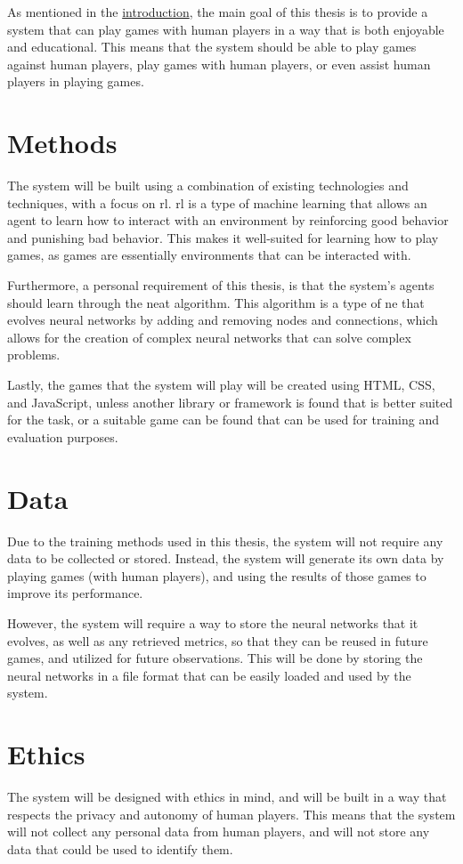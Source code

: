 As mentioned in the \hyperref[ch:intro]{introduction}, the main goal of this
thesis is to provide a system that can play games with human players in a way
that is both enjoyable and educational. This means that the system should be
able to play games against human players, play games with human players, or
even assist human players in playing games.

\section{Methods}\label{sec:innovation-methods}
The system will be built using a combination of existing technologies and
techniques, with a focus on \gls{rl}. \gls{rl} is a type of machine learning
that allows an agent to learn how to interact with an environment by
reinforcing good behavior and punishing bad behavior. This makes it well-suited
for learning how to play games, as games are essentially environments that can
be interacted with.

Furthermore, a personal requirement of this thesis, is that the system's 
agents should learn through the \gls{neat} algorithm. This algorithm is a type
of \gls{ne} that evolves neural networks by adding and removing nodes and
connections, which allows for the creation of complex neural networks that can
solve complex problems.

Lastly, the games that the system will play will be created using HTML, CSS,
and JavaScript, unless another library or framework is found that is better
suited for the task, or a suitable game can be found that can be used for
training and evaluation purposes.

\section{Data}\label{sec:innovation-data}
Due to the training methods used in this thesis, the system will not require
any data to be collected or stored. Instead, the system will generate its own
data by playing games (with human players), and using the results of those
games to improve its performance.

However, the system will require a way to store the neural networks that it
evolves, as well as any retrieved metrics, so that they can be reused in future
games, and utilized for future observations. This will be done by storing the
neural networks in a file format that can be easily loaded and used by the
system.

\section{Ethics}\label{sec:innovation-ethics}
The system will be designed with ethics in mind, and will be built in a way
that respects the privacy and autonomy of human players. This means that the
system will not collect any personal data from human players, and will not
store any data that could be used to identify them.

